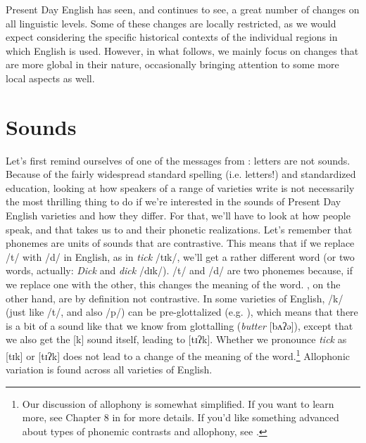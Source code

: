 Present Day English has seen, and continues to see, a great number of changes on all linguistic levels. Some of these changes are locally restricted, as we would expect considering the specific historical contexts of the individual regions in which English is used. However, in what follows, we mainly focus on changes that are more global in their nature, occasionally bringing attention to some more local aspects as well.

\section{Sounds}\label{englishtoday-sounds}
Let's first remind ourselves of one of the messages from : letters are not sounds. Because of the fairly widespread standard spelling (i.e. letters!) and standardized education, looking at how speakers of a range of varieties write is not necessarily the most thrilling thing to do if we're interested in the sounds of Present Day English varieties and how they differ. For that, we'll have to look at how people speak, and that takes us to  and their phonetic realizations. Let's remember that phonemes are units of sounds that are contrastive. This means that if we replace /t/ with /d/ in English, as in \emph{tick} /tɪk/, we'll get a rather different word (or two words, actually: \emph{Dick} and \emph{dick} /dɪk/). /t/ and /d/ are two phonemes because, if we replace one with the other, this changes the meaning of the word. , on the other hand, are by definition not contrastive. In some varieties of English, /k/ (just like /t/, and also /p/) can be pre-glottalized (e.g. \citealp{Wells1982b}), which means that there is a bit of a sound like that we know from glottalling (\textit{butter} [bʌʔə]), except that we also get the [k] sound itself, leading to [tɪʔk]. Whether we pronounce \emph{tick} as [tɪk] or [tɪʔk] does not lead to a change of the meaning of the word.\footnote{Our discussion of allophony is somewhat simplified. If you want to learn more, see Chapter 8 in \citet{DavenportHannahs2013} for more details. If you'd like something advanced about types of phonemic contrasts and allophony, see \citet{Hall2009}.} Allophonic variation is found across all varieties of English.

